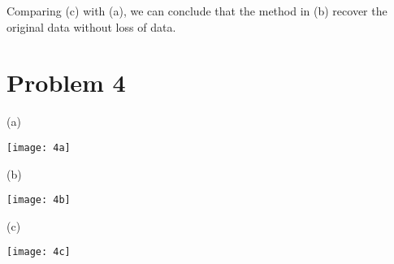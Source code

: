 \documentclass[11pt]{article} %
\theoremstyle{definition}
\begin{document}
Comparing (c) with (a), we can conclude that the method in (b) recover the original data without loss of data.

\section*{Problem 4}


(a)
\begin{center}
\texttt{[image: 4a]}
\end{center}

(b)
\begin{center}
\texttt{[image: 4b]}
\end{center}


(c)
\begin{center}
\texttt{[image: 4c]}
\end{center}
\end{document}
